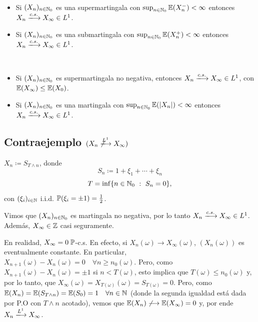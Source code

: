 
\begin{theorem}~
	\begin{itemize}
		\item Si $(X_{n})_{n \in \mathbb{N}_{0}}$ es una supermartingala con $\sup_{n \in \mathbb{N}_{0}} \mathbb{E}(X_{n}^{-}) < \infty$ entonces $X_{n} \xlongrightarrow{c.s.} X_{\infty} \in L^{1}$.

		\item Si $(X_{n})_{n \in \mathbb{N}_{0}}$ es una submartingala con $\sup_{n \in \mathbb{N}_{0}} \mathbb{E}(X_{n}^{+}) < \infty$ entonces $X_{n} \xlongrightarrow{c.s.} X_{\infty} \in L^{1}$.
	\end{itemize}
\end{theorem}

\begin{corollary}~
	\begin{itemize}
		\item Si $(X_{n})_{n \in \mathbb{N}_{0}}$ es supermartingala no negativa, entonces $X_{n} \xlongrightarrow{c.s.} X_{\infty} \in L^{1}$, con $\mathbb{E}(X_{\infty}) \leq \mathbb{E}(X_{0})$.

		\item Si $(X_{n})_{n \in \mathbb{N}_{0}}$ es una martingala con $\sup_{n \in \mathbb{N}_{0}} \mathbb{E}(|X_{n}|) < \infty$ entonces $X_{n} \xlongrightarrow{c.s.} X_{\infty} \in L^{1}$.
	\end{itemize}
\end{corollary}

\subsection{Contraejemplo $(X_{n} \not\xlongrightarrow{L^{1}} X_{\infty})$}

$X_{n} \coloneq S_{T \wedge n}$, donde 
\[ S_{n} \coloneq 1 + \xi_{1} + \cdots + \xi_{n} \]
\[ T = \inf \{n \in \mathbb{N}_{0} \ : \ S_{n} = 0\}, \]
con $(\xi_{i})_{i \in \mathbb{N}}$ i.i.d. $\mathbb{P}(\xi_{i} = \pm 1) = \frac{1}{2}$. \par
Vimos que $(X_{n})_{n \in \mathbb{N}_{0}}$ es martingala no negativa, por lo tanto $X_{n} \xlongrightarrow{c.s.} X_{\infty} \in L^{1}$. Además, $X_{\infty} \in \mathbb{Z}$ casi seguramente.

En realidad, $X_{\infty} = 0 \; \mathbb{P}$-c.s. En efecto, si $X_{n}(\omega) \longrightarrow X_{\infty}(\omega)$, $(X_{n}(\omega))$ es eventualmente constante. En particular, $X_{n+1}(\omega) - X_{n}(\omega) = 0 \quad \forall n \geq n_{0}(\omega)$. Pero, como $X_{n+1}(\omega) - X_{n}(\omega) = \pm 1$ si $n < T(\omega)$, esto implica que $T(\omega) \leq n_{0}(\omega)$ y, por lo tanto, que $X_{\infty}(\omega) = X_{T(\omega)}(\omega) = S_{T(\omega)} = 0$. Pero, como $\mathbb{E}(X_{n}) = \mathbb{E}(S_{T \wedge n}) = \mathbb{E}(S_{0}) = 1 \quad \forall n \in \mathbb{N}$ (donde la segunda igualdad está dada por P.O con $T \wedge n$ acotado), vemos que $\mathbb{E}(X_{n}) \not\longrightarrow \mathbb{E}(X_{\infty}) = 0$ y, por ende $X_{n} \xlongrightarrow{L^{1}} X_{\infty}$.

